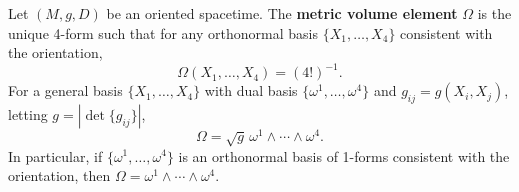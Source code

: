 Let $(M, g, D)$ be an oriented spacetime. The \textbf{metric volume element} $\Omega$ is the unique 4-form such that for any orthonormal basis $\{X_1, \ldots, X_4\}$ consistent with the orientation,
$$\Omega(X_1, \ldots, X_4) = (4!)^{-1}.$$
For a general basis $\{X_1, \ldots, X_4\}$ with dual basis $\{\omega^1, \ldots, \omega^4\}$ and $g_{ij} = g(X_i, X_j)$, letting $g = |\det\{g_{ij}\}|$,
$$\Omega = \sqrt{g}\,\omega^1 \wedge \cdots \wedge \omega^4.$$
In particular, if $\{\omega^1, \ldots, \omega^4\}$ is an orthonormal basis of 1-forms consistent with the orientation, then $\Omega = \omega^1 \wedge \cdots \wedge \omega^4$.
